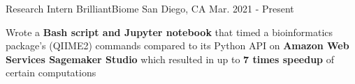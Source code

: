 \begin{cventries}
  \cventry
    {Research Intern} %
    {BrilliantBiome} %
    {San Diego, CA} %
    {Mar. 2021 - Present} %
    {
      \begin{cvitems} %
        \item { Wrote a \textbf{Bash script and Jupyter notebook} that timed a bioinformatics package's (QIIME2) commands compared to its Python API on \textbf{Amazon Web Services Sagemaker Studio} which resulted in up to \textbf{7 times speedup} of certain computations}
      \end{cvitems}
    }



\end{cventries}

